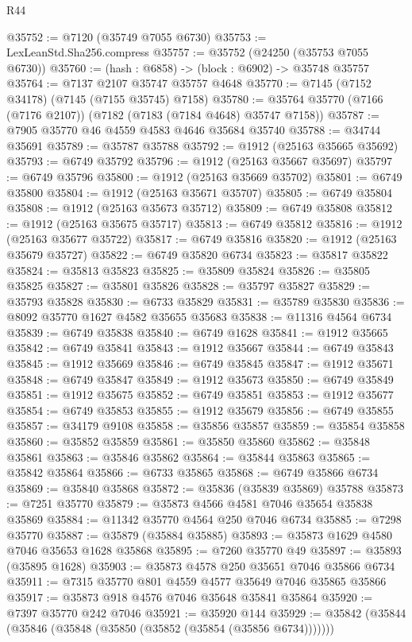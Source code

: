\begin{lexlean}{R44}
\begin{coremodule}
{@35752 := @7120 (@35749 @7055 @6730)
@35753 := LexLeanStd.Sha256.compress
@35757 := @35752 (@24250 (@35753 @7055 @6730))
@35760 := (hash : @6858) -> (block : @6902) -> @35748 @35757
@35764 := @7137 @2107 @35747 @35757 @4648
@35770 := @7145 (@7152 @34178) (@7145 (@7155 @35745) @7158)
@35780 := @35764 @35770 (@7166 (@7176 @2107)) (@7182 (@7183 (@7184 @4648) @35747 @7158))
@35787 := @7905 @35770 @46 @4559 @4583 @4646 @35684 @35740
@35788 := @34744 @35691
@35789 := @35787 @35788
@35792 := @1912 (@25163 @35665 @35692)
@35793 := @6749 @35792
@35796 := @1912 (@25163 @35667 @35697)
@35797 := @6749 @35796
@35800 := @1912 (@25163 @35669 @35702)
@35801 := @6749 @35800
@35804 := @1912 (@25163 @35671 @35707)
@35805 := @6749 @35804
@35808 := @1912 (@25163 @35673 @35712)
@35809 := @6749 @35808
@35812 := @1912 (@25163 @35675 @35717)
@35813 := @6749 @35812
@35816 := @1912 (@25163 @35677 @35722)
@35817 := @6749 @35816
@35820 := @1912 (@25163 @35679 @35727)
@35822 := @6749 @35820 @6734
@35823 := @35817 @35822
@35824 := @35813 @35823
@35825 := @35809 @35824
@35826 := @35805 @35825
@35827 := @35801 @35826
@35828 := @35797 @35827
@35829 := @35793 @35828
@35830 := @6733 @35829
@35831 := @35789 @35830
@35836 := @8092 @35770 @1627 @4582 @35655 @35683
@35838 := @11316 @4564 @6734
@35839 := @6749 @35838
@35840 := @6749 @1628
@35841 := @1912 @35665
@35842 := @6749 @35841
@35843 := @1912 @35667
@35844 := @6749 @35843
@35845 := @1912 @35669
@35846 := @6749 @35845
@35847 := @1912 @35671
@35848 := @6749 @35847
@35849 := @1912 @35673
@35850 := @6749 @35849
@35851 := @1912 @35675
@35852 := @6749 @35851
@35853 := @1912 @35677
@35854 := @6749 @35853
@35855 := @1912 @35679
@35856 := @6749 @35855
@35857 := @34179 @9108
@35858 := @35856 @35857
@35859 := @35854 @35858
@35860 := @35852 @35859
@35861 := @35850 @35860
@35862 := @35848 @35861
@35863 := @35846 @35862
@35864 := @35844 @35863
@35865 := @35842 @35864
@35866 := @6733 @35865
@35868 := @6749 @35866 @6734
@35869 := @35840 @35868
@35872 := @35836 (@35839 @35869) @35788
@35873 := @7251 @35770
@35879 := @35873 @4566 @4581 @7046 @35654 @35838 @35869
@35884 := @11342 @35770 @4564 @250 @7046 @6734
@35885 := @7298 @35770
@35887 := @35879 (@35884 @35885)
@35893 := @35873 @1629 @4580 @7046 @35653 @1628 @35868
@35895 := @7260 @35770 @49
@35897 := @35893 (@35895 @1628)
@35903 := @35873 @4578 @250 @35651 @7046 @35866 @6734
@35911 := @7315 @35770 @801 @4559 @4577 @35649 @7046 @35865 @35866
@35917 := @35873 @918 @4576 @7046 @35648 @35841 @35864
@35920 := @7397 @35770 @242 @7046
@35921 := @35920 @144
@35929 := @35842 (@35844 (@35846 (@35848 (@35850 (@35852 (@35854 (@35856 @6734)))))))
}
\end{coremodule}
\end{lexlean}
